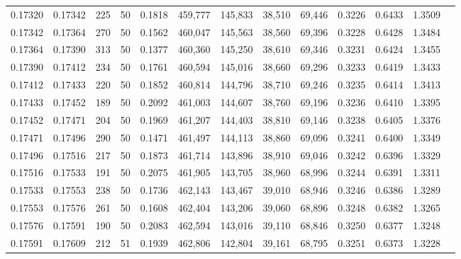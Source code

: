 \begin{tabular}{rrrrrrrrrrrrr}
0.17320 & 0.17342 &   225 &  50 &                                     0.1818 & 459,777 & 145,833 &  38,510 &  69,446 & 0.3226 & 0.6433 & 1.3509 \\
0.17342 & 0.17364 &   270 &  50 &                                     0.1562 & 460,047 & 145,563 &  38,560 &  69,396 & 0.3228 & 0.6428 & 1.3484 \\
0.17364 & 0.17390 &   313 &  50 &                                     0.1377 & 460,360 & 145,250 &  38,610 &  69,346 & 0.3231 & 0.6424 & 1.3455 \\
0.17390 & 0.17412 &   234 &  50 &                                     0.1761 & 460,594 & 145,016 &  38,660 &  69,296 & 0.3233 & 0.6419 & 1.3433 \\
0.17412 & 0.17433 &   220 &  50 &                                     0.1852 & 460,814 & 144,796 &  38,710 &  69,246 & 0.3235 & 0.6414 & 1.3413 \\
0.17433 & 0.17452 &   189 &  50 &                                     0.2092 & 461,003 & 144,607 &  38,760 &  69,196 & 0.3236 & 0.6410 & 1.3395 \\
0.17452 & 0.17471 &   204 &  50 &                                     0.1969 & 461,207 & 144,403 &  38,810 &  69,146 & 0.3238 & 0.6405 & 1.3376 \\
0.17471 & 0.17496 &   290 &  50 &                                     0.1471 & 461,497 & 144,113 &  38,860 &  69,096 & 0.3241 & 0.6400 & 1.3349 \\
0.17496 & 0.17516 &   217 &  50 &                                     0.1873 & 461,714 & 143,896 &  38,910 &  69,046 & 0.3242 & 0.6396 & 1.3329 \\
0.17516 & 0.17533 &   191 &  50 &                                     0.2075 & 461,905 & 143,705 &  38,960 &  68,996 & 0.3244 & 0.6391 & 1.3311 \\
0.17533 & 0.17553 &   238 &  50 &                                     0.1736 & 462,143 & 143,467 &  39,010 &  68,946 & 0.3246 & 0.6386 & 1.3289 \\
0.17553 & 0.17576 &   261 &  50 &                                     0.1608 & 462,404 & 143,206 &  39,060 &  68,896 & 0.3248 & 0.6382 & 1.3265 \\
0.17576 & 0.17591 &   190 &  50 &                                     0.2083 & 462,594 & 143,016 &  39,110 &  68,846 & 0.3250 & 0.6377 & 1.3248 \\
0.17591 & 0.17609 &   212 &  51 &                                     0.1939 & 462,806 & 142,804 &  39,161 &  68,795 & 0.3251 & 0.6373 & 1.3228 \\

\end{tabular}
